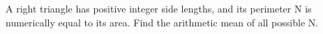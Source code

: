 A right triangle has positive integer side lengths, and its perimeter N is numerically equal to its area. Find the arithmetic mean of all possible N.
